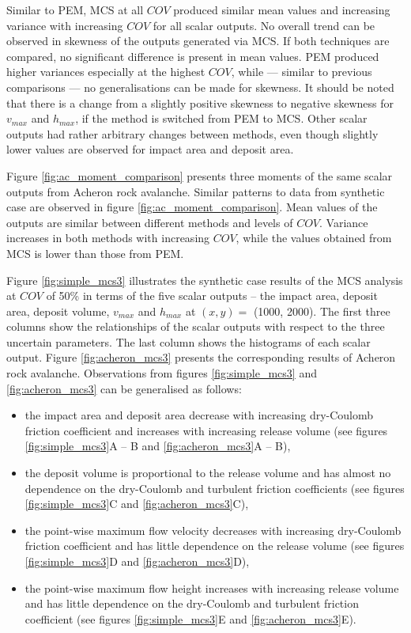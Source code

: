\documentclass[utf8]{FrontiersinHarvard}
\begin{document}
Similar to PEM, MCS at all $COV$ produced similar mean values and increasing variance with increasing $COV$ for all scalar outputs. No overall trend can be observed in skewness of the outputs generated via MCS. If both techniques are compared, no significant difference is present in mean values. PEM produced higher variances especially at the highest $COV$, while --- similar to previous comparisons --- no generalisations can be made for skewness. It should be noted that there is a change from a slightly positive skewness to negative skewness for $v_{max}$ and $h_{max}$, if the method is switched from PEM to MCS. Other scalar outputs had rather arbitrary changes between methods, even though slightly lower values are observed for impact area and deposit area.

Figure \ref{fig:ac_moment_comparison} presents three moments of the same scalar outputs from Acheron rock avalanche. Similar patterns to data from synthetic case are observed in figure \ref{fig:ac_moment_comparison}. Mean values of the outputs are similar between different methods and levels of $COV$. Variance increases in both methods with increasing $COV$, while the values obtained from MCS is lower than those from PEM.

Figure \ref{fig:simple_mcs3} illustrates the synthetic case results of the MCS analysis at $COV$ of 50\% in terms of the five scalar outputs -- the impact area, deposit area, deposit volume, $v_{max}$ and $h_{max}$ at $\left( x, y \right) = $ (1000, 2000). The first three columns show the relationships of the scalar outputs with respect to the three uncertain parameters. The last column shows the histograms of each scalar output. Figure \ref{fig:acheron_mcs3} presents the corresponding results of Acheron rock avalanche. Observations from figures \ref{fig:simple_mcs3} and \ref{fig:acheron_mcs3} can be generalised as follows:

\begin{itemize}
    \item the impact area and deposit area decrease with increasing dry-Coulomb friction coefficient and increases with increasing release volume (see figures \ref{fig:simple_mcs3}A -- B and \ref{fig:acheron_mcs3}A -- B),
    \item the deposit volume is proportional to the release volume and has almost no dependence on the dry-Coulomb and turbulent friction coefficients (see figures \ref{fig:simple_mcs3}C and \ref{fig:acheron_mcs3}C),
    \item the point-wise maximum flow velocity decreases with increasing dry-Coulomb friction coefficient and has little dependence on the release volume (see figures \ref{fig:simple_mcs3}D and \ref{fig:acheron_mcs3}D),
    \item the point-wise maximum flow height increases with increasing release volume and has little dependence on the dry-Coulomb and turbulent friction coefficient (see figures \ref{fig:simple_mcs3}E and \ref{fig:acheron_mcs3}E).
\end{itemize} 
\end{document}
